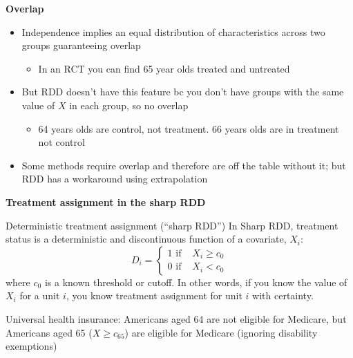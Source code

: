 \documentclass[notes=show]{beamer}
\begin{document}
\begin{frame}[plain]
\begin{center}
\textbf{Overlap}
\end{center}

\begin{itemize}
\item Independence implies an equal distribution of characteristics across two groups guaranteeing overlap
	\begin{itemize}
	\item In an RCT you can find 65 year olds treated and untreated
	\end{itemize}
\item But RDD doesn't have this feature bc you don't have groups with the same value of $X$ in each group, so no overlap
	\begin{itemize}
	\item 64 years olds are control, not treatment. 66 years olds are in treatment not control
	\end{itemize}
\item Some methods require overlap and therefore are off the table without it; but RDD has a workaround using extrapolation
\end{itemize}

\end{frame}


\begin{frame}[plain]

	\begin{center}
	\textbf{Treatment assignment in the sharp RDD}
	\end{center}

		\begin{block}{Deterministic treatment assignment (``sharp RDD'')}
		In Sharp RDD, treatment status is a deterministic and discontinuous function of a covariate, $X_i$:  $$D_i =\begin{cases} 1 \text{ if }& X_i\geq{c_0} \\ 0 \text{ if } & X_i < c_0  \end{cases}$$where $c_0$ is a known threshold or cutoff.  In other words, if you know the value of $X_i$ for a unit $i$, you know treatment assignment for unit $i$ with certainty.  
		\end{block}
	
Universal health insurance: Americans aged 64 are not eligible for Medicare, but Americans aged 65 ($X\geq c_{65}$) are eligible for Medicare (ignoring disability exemptions)


\end{frame}	
	
\end{document}

